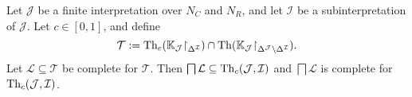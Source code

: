 \begin{Theorem}
  \label{thm:bases-of-untrusted-interpretations-from-bases-of-contexts}
  Let $\mathcal{J}$ be a finite interpretation over $N_{C}$ and $N_{R}$, and let
  $\mathcal{I}$ be a subinterpretation of $\mathcal{J}$.  Let $c \in [0,1]$, and define
  \begin{equation*}
    \mathcal{T} := \operatorname{Th}_{c}({\mathbb{K}}_{\mathcal{J}}\mathord{\upharpoonright}_{\Delta^{\mathcal{I}}}) \cap
    \operatorname{Th}({\mathbb{K}}_{\mathcal{J}}\mathord{\upharpoonright}_{\Delta^{\mathcal{J}}\setminus\Delta^{\mathcal{I}}}).
  \end{equation*}
  Let $\mathcal{L} \subseteq \mathcal{T}$ be complete for $\mathcal{T}$.  Then $\bigsqcap
  \mathcal{L} \subseteq \operatorname{Th}_{c}(\mathcal{J}, \mathcal{I})$ and $\bigsqcap \mathcal{L}$ is
  complete for $\operatorname{Th}_{c}(\mathcal{J}, \mathcal{I})$.
\end{Theorem}

